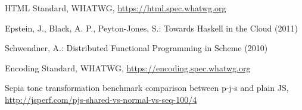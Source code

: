 \documentclass[runningheads,a4paper]{llncs}
\begin{document}
\begin{thebibliography}{4}
 HTML Standard, WHATWG, \url{https://html.spec.whatwg.org}

 Epstein, J., Black, A. P., Peyton-Jones, S.: Towards Haskell in the Cloud (2011)

 Schwendner, A.: Distributed Functional Programming in Scheme (2010)

 Encoding Standard, WHATWG, \url{https://encoding.spec.whatwg.org}

 Sepia tone transformation benchmark comparison between p-j-s and plain JS, \url{http://jsperf.com/pjs-shared-vs-normal-vs-seq-100/4}

\end{thebibliography}
\end{document}

